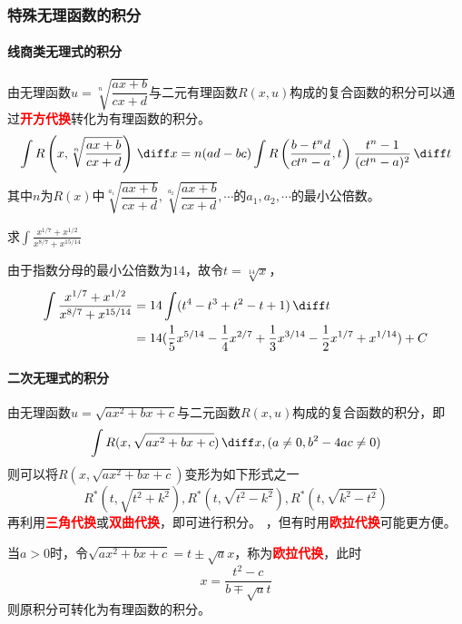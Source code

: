 \subsubsection{特殊无理函数的积分}
\paragraph{线商类无理式的积分}
由无理函数$u=\sqrt[n]{\dfrac{ax+b}{cx+d}}$与二元有理函数$R(x,u)$构成的复合函数的积分可以通过\textcolor{red}{\textbf{\textsf{开方代换}}}转化为有理函数的积分。
\[ \int R\left(x,\sqrt[n]{\frac{ax+b}{cx+d}}\right)\,\diff x = n(ad-bc)\int R\left(\frac{b-t^nd}{ct^n-a},t\right)\frac{t^n-1}{(ct^n-a)^2}\,\diff t \]
其中$n$为$R(x)$中$\sqrt[a_1]{\dfrac{ax+b}{cx+d}},\sqrt[a_2]{\dfrac{ax+b}{cx+d}},\cdots$的$a_1,a_2,\cdots$的最小公倍数。
\begin{example}
    求$\displaystyle\int\frac{x^{1/7}+x^{1/2}}{x^{8/7}+x^{15/14}}$
\end{example}
\begin{solution}
    由于指数分母的最小公倍数为$14$，故令$t=\sqrt[14]{x}$，
    \begin{align*}
        \int\frac{x^{1/7}+x^{1/2}}{x^{8/7}+x^{15/14}} & = 14\int(t^4-t^3+t^2-t+1)\,\diff t                                                                     \\
                                                      & =14(\frac{1}{5}x^{5/14} - \frac{1}{4}x^{2/7} + \frac{1}{3}x^{3/14} - \frac{1}{2}x^{1/7} + x^{1/14}) +C
    \end{align*}
\end{solution}

\paragraph{二次无理式的积分}
由无理函数$u=\sqrt{ax^2+bx+c}$与二元函数$R(x,u)$构成的复合函数的积分，即
\[ \int R(x,\sqrt{ax^2+bx+c})\,\diff x, (a\neq 0, b^2-4ac\neq 0) \]
则可以将$R(x,\sqrt{ax^2+bx+c})$变形为如下形式之一
\[ R^*(t, \sqrt{t^2+k^2}), R^*(t, \sqrt{t^2-k^2}), R^*(t, \sqrt{k^2-t^2}) \]
再利用\textcolor{red}{\textsf{\textbf{三角代换}}}或\textcolor{red}{\textsf{\textbf{双曲代换}}}，即可进行积分。
，但有时用\textcolor{red}{\textsf{\textbf{欧拉代换}}}可能更方便。

当$a>0$时，令$\sqrt{ax^2+bx+c}=t\pm\sqrt{a}x$，称为\textcolor{red}{\textsf{\textbf{欧拉代换}}}，此时
\[x=\frac{t^2-c}{b\mp\sqrt{a}t}\]
则原积分可转化为有理函数的积分。

